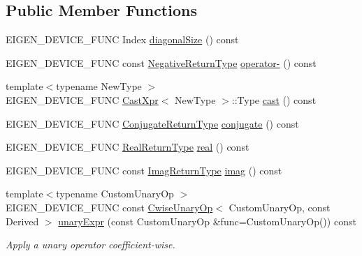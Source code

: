 \subsection*{Public Member Functions}
\begin{DoxyCompactItemize}
\item 
E\+I\+G\+E\+N\+\_\+\+D\+E\+V\+I\+C\+E\+\_\+\+F\+U\+NC Index \mbox{\hyperlink{class_eigen_1_1_matrix_base_a3bcb5338f3ba8a1a5609bd1802a9bc95}{diagonal\+Size}} () const
\item 
E\+I\+G\+E\+N\+\_\+\+D\+E\+V\+I\+C\+E\+\_\+\+F\+U\+NC const \mbox{\hyperlink{class_eigen_1_1_cwise_unary_op}{Negative\+Return\+Type}} \mbox{\hyperlink{class_eigen_1_1_matrix_base_a65cba62d44d32bce299e17f2d8970277}{operator-\/}} () const
\item 
{\footnotesize template$<$typename New\+Type $>$ }\\E\+I\+G\+E\+N\+\_\+\+D\+E\+V\+I\+C\+E\+\_\+\+F\+U\+NC \mbox{\hyperlink{struct_eigen_1_1_matrix_base_1_1_cast_xpr}{Cast\+Xpr}}$<$ New\+Type $>$\+::Type \mbox{\hyperlink{class_eigen_1_1_matrix_base_ae8dd1236cd87b33640529b91ccb6f6cd}{cast}} () const
\item 
E\+I\+G\+E\+N\+\_\+\+D\+E\+V\+I\+C\+E\+\_\+\+F\+U\+NC \mbox{\hyperlink{struct_eigen_1_1internal_1_1true__type}{Conjugate\+Return\+Type}} \mbox{\hyperlink{class_eigen_1_1_matrix_base_a28ca7fb2f2140c1429492788a65ad741}{conjugate}} () const
\item 
E\+I\+G\+E\+N\+\_\+\+D\+E\+V\+I\+C\+E\+\_\+\+F\+U\+NC \mbox{\hyperlink{struct_eigen_1_1internal_1_1true__type}{Real\+Return\+Type}} \mbox{\hyperlink{class_eigen_1_1_matrix_base_a1be92242289c25a366fa2299b139e6fc}{real}} () const
\item 
E\+I\+G\+E\+N\+\_\+\+D\+E\+V\+I\+C\+E\+\_\+\+F\+U\+NC const \mbox{\hyperlink{class_eigen_1_1_cwise_unary_op}{Imag\+Return\+Type}} \mbox{\hyperlink{class_eigen_1_1_matrix_base_ae1bf94b5a4680abddd29dc4153ad8ba8}{imag}} () const
\item 
{\footnotesize template$<$typename Custom\+Unary\+Op $>$ }\\E\+I\+G\+E\+N\+\_\+\+D\+E\+V\+I\+C\+E\+\_\+\+F\+U\+NC const \mbox{\hyperlink{class_eigen_1_1_cwise_unary_op}{Cwise\+Unary\+Op}}$<$ Custom\+Unary\+Op, const Derived $>$ \mbox{\hyperlink{class_eigen_1_1_matrix_base_a03db69599e5dc10f9b7524bbdd0bdcbb}{unary\+Expr}} (const Custom\+Unary\+Op \&func=Custom\+Unary\+Op()) const
\begin{DoxyCompactList}\small\item\em Apply a unary operator coefficient-\/wise. \end{DoxyCompactList}\item 

\end{DoxyCompactItemize}
